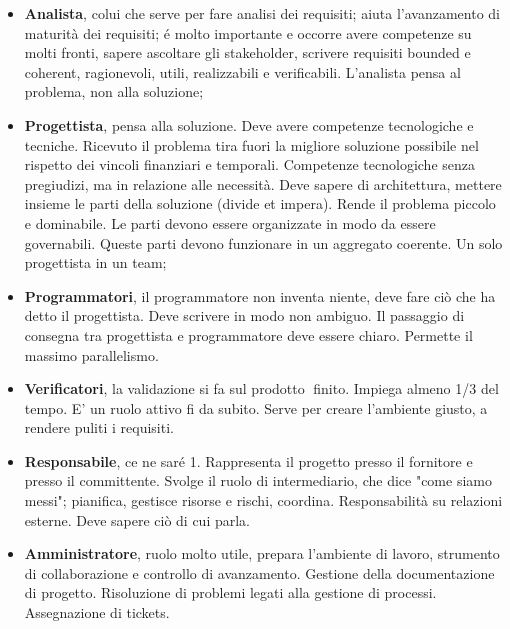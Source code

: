 \documentclass[a4paper,10pt] {article}
\begin{document}
\begin{itemize}
\begin{itemize}
\begin{itemize}
	\item \textbf{Analista}, colui che serve per fare analisi dei requisiti; 
	aiuta l'avanzamento di maturità dei requisiti; é
	molto importante e occorre avere competenze su molti fronti, sapere 
	ascoltare gli stakeholder, scrivere requisiti bounded e coherent, 
	ragionevoli, utili, realizzabili e verificabili. L'analista pensa al 
	problema, non alla soluzione;
	
	
	\item \textbf{Progettista}, pensa alla soluzione. Deve avere competenze 
	tecnologiche e tecniche. Ricevuto il problema tira fuori la migliore 
	soluzione possibile nel rispetto dei vincoli finanziari e temporali. 
	Competenze tecnologiche senza pregiudizi, ma in relazione alle necessità. 
	Deve sapere di architettura, mettere insieme le parti della soluzione 
	(divide et impera). Rende il problema piccolo e dominabile. Le
	parti devono essere organizzate in modo da essere governabili. Queste parti 
	devono funzionare in un aggregato coerente. Un solo progettista in un team;
	
	
	\item \textbf{Programmatori}, il programmatore non inventa niente, deve 
	fare ciò che ha detto il progettista. Deve scrivere in modo non ambiguo. 
	Il passaggio di consegna tra progettista e programmatore deve essere
	chiaro. Permette il massimo parallelismo. 
	
	
	\item \textbf{Verificatori}, la validazione si fa sul prodotto finito. 
	Impiega almeno 1/3 del tempo. E' un ruolo attivo fi da subito. Serve per 
	creare l'ambiente giusto, a rendere puliti i 
	requisiti.
	
	
	\item \textbf{Responsabile}, ce ne saré 1. Rappresenta il progetto presso 
	il fornitore e presso il committente. Svolge il ruolo di intermediario, che 
	dice "come siamo messi"; pianifica, gestisce risorse e rischi,
	coordina. Responsabilità su relazioni esterne. Deve sapere ciò di cui 
	parla. 


	\item \textbf{Amministratore}, ruolo molto utile, prepara l'ambiente di 
	lavoro, strumento di collaborazione e controllo di avanzamento. Gestione 
	della documentazione di progetto. 
	Risoluzione di problemi legati alla gestione di processi. Assegnazione di 
	tickets.
	\end{itemize}

\end{itemize}


\end{itemize}
\end{document}
